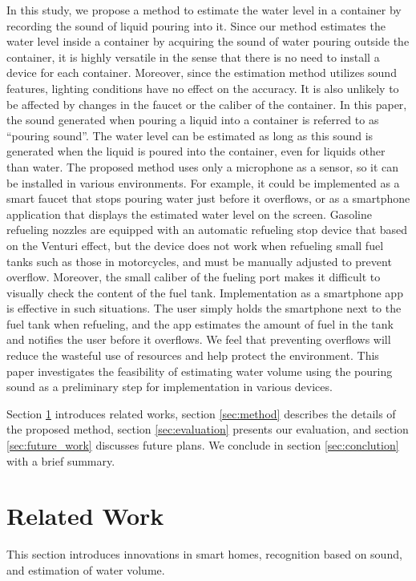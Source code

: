 \documentclass[manuscript,screen,review]{acmart}
\begin{document}
In this study, we propose a method to estimate the water level in a container by recording the sound of liquid pouring into it. Since our method estimates the water level inside a container by acquiring the sound of water pouring outside the container, it is highly versatile in the sense that there is no need to install a device for each container. Moreover, since the estimation method utilizes sound features, lighting conditions have no effect on the accuracy. It is also unlikely to be affected by changes in the faucet or the caliber of the container. In this paper, the sound generated when pouring a liquid into a container is referred to as ``pouring sound''. The water level can be estimated as long as this sound is generated when the liquid is poured into the container, even for liquids other than water. The proposed method uses only a microphone as a sensor, so it can be installed in various environments. For example, it could be implemented as a smart faucet that stops pouring water just before it overflows, or as a smartphone application that displays the estimated water level on the screen. Gasoline refueling nozzles are equipped with an automatic refueling stop device that based on the Venturi effect, but the device does not work when refueling small fuel tanks such as those in motorcycles, and must be manually adjusted to prevent overflow. Moreover, the small caliber of the fueling port makes it difficult to visually check the content of the fuel tank. Implementation as a smartphone app is effective in such situations. The user simply holds the smartphone next to the fuel tank when refueling, and the app estimates the amount of fuel in the tank and notifies the user before it overflows. We feel that preventing overflows will reduce the wasteful use of resources and help protect the environment. This paper investigates the feasibility of estimating water volume using the pouring sound as a preliminary step for implementation in various devices.\par

Section \ref{sec:related} introduces related works, section \ref{sec:method} describes the details of the proposed method, section \ref{sec:evaluation} presents our evaluation, and section \ref{sec:future_work} discusses future plans. We conclude in section \ref{sec:conclution} with a brief summary.



\section{Related Work}
\label{sec:related}
This section introduces innovations in smart homes, recognition based on sound, and estimation of water volume.
\end{document}
